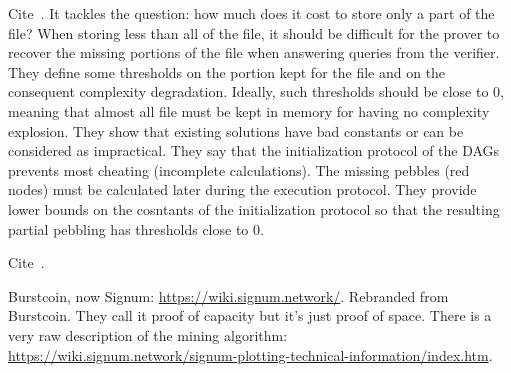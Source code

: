 Cite~\cite{Reyzin23}. It tackles the question: how much does it cost to store only a part of the file?
When storing less than all of the file, it should be difficult for the prover to recover the
missing portions of the file when answering queries from the verifier. They define some thresholds
on the portion kept for the file and on the consequent complexity degradation. Ideally, such thresholds
should be close to 0, meaning that almost all file must be kept in memory for having no complexity
explosion. They show that existing solutions have bad constants or can be considered as impractical.
They say that the initialization protocol of the DAGs prevents most cheating (incomplete calculations).
The missing pebbles (red nodes) must be calculated later during the execution protocol.
They provide lower bounds on the cosntants of the initialization protocol so that
the resulting partial pebbling has thresholds close to 0.

Cite~\cite{DworkN92}.

Burstcoin, now Signum: \url{https://wiki.signum.network/}. Rebranded from Burstcoin.
They call it proof of capacity but it's just proof of space.
There is a very raw description of the mining algorithm:
\url{https://wiki.signum.network/signum-plotting-technical-information/index.htm}.
